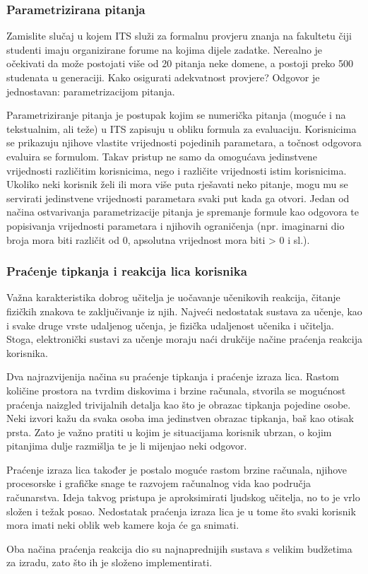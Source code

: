 \documentclass[times, utf8, zavrsni, numeric]{fer}
\begin{document}
\subsubsection{Parametrizirana pitanja}
Zamislite slučaj u kojem ITS služi za formalnu provjeru znanja na fakultetu čiji studenti imaju organizirane forume na kojima dijele zadatke. Nerealno je očekivati da može postojati više od 20 pitanja neke domene, a postoji preko 500 studenata u generaciji. Kako osigurati adekvatnost provjere? Odgovor je jednostavan: parametrizacijom pitanja.\citep{Sosnovsky03web-basedparameterized}
\par
Parametriziranje pitanja je postupak kojim se numerička pitanja (moguće i na tekstualnim, ali teže) u ITS zapisuju u obliku formula za evaluaciju. Korisnicima se prikazuju njihove vlastite vrijednosti pojedinih parametara, a točnost odgovora evaluira se formulom. Takav pristup ne samo da omogućava jedinstvene vrijednosti različitim korisnicima, nego i različite vrijednosti istim korisnicima. Ukoliko neki korisnik želi ili mora više puta rješavati neko pitanje, mogu mu se servirati jedinstvene vrijednosti parametara svaki put kada ga otvori. Jedan od načina ostvarivanja parametrizacije pitanja je spremanje formule kao odgovora te popisivanja vrijednosti parametara i njihovih ograničenja (npr. imaginarni dio broja mora biti različit od 0, apsolutna vrijednost mora biti > 0 i sl.).

\subsubsection{Praćenje tipkanja i reakcija lica korisnika}
Važna karakteristika dobrog učitelja je uočavanje učenikovih reakcija, čitanje fizičkih znakova te zaključivanje iz njih. Najveći nedostatak sustava za učenje, kao i svake druge vrste udaljenog učenja, je fizička udaljenost učenika i učitelja. Stoga, elektronički sustavi za učenje moraju naći drukčije načine praćenja reakcija korisnika.
\par
Dva najrazvijenija načina su praćenje tipkanja i praćenje izraza lica. Rastom količine prostora na tvrdim diskovima i brzine računala, stvorila se mogućnost praćenja naizgled trivijalnih detalja kao što je obrazac tipkanja pojedine osobe. Neki izvori kažu da svaka osoba ima jedinstven obrazac tipkanja, baš kao otisak prsta. Zato je važno pratiti u kojim je situacijama korisnik ubrzan, o kojim pitanjima dulje razmišlja te je li mijenjao neki odgovor.\citep{keystroke}
\par
Praćenje izraza lica također je postalo moguće rastom brzine računala, njihove procesorske i grafičke snage te razvojem računalnog vida kao područja računarstva. Ideja takvog pristupa je aproksimirati ljudskog učitelja, no to je vrlo složen i težak posao. Nedostatak praćenja izraza lica je u tome što svaki korisnik mora imati neki oblik web kamere koja će ga snimati.
\par
Oba načina praćenja reakcija dio su najnaprednijih sustava s velikim budžetima za izradu, zato što ih je složeno implementirati. 
\end{document}
